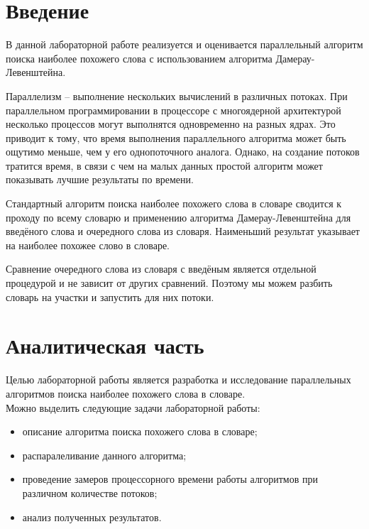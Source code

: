 \documentclass[12pt,a4paper]{report}
\begin{document}

\tableofcontents

\newpage
\chapter*{Введение}

В данной лабораторной работе реализуется и оценивается параллельный алгоритм поиска наиболее похожего слова с использованием алгоритма Дамерау-Левенштейна.

Параллелизм -- выполнение нескольких вычислений в различных потоках. 
При параллельном программировании в процессоре с многоядерной архитектурой несколько процессов могут выполнятся 
одновременно на разных ядрах.
Это приводит к тому, что время выполнения параллельного алгоритма может быть ощутимо меньше, чем у его 
однопоточного аналога. Однако, на создание потоков тратится время, в связи с чем на малых данных простой алгоритм может показывать лучшие результаты по времени.

Стандартный алгоритм поиска наиболее похожего слова в словаре сводится к проходу по всему словарю и применению алгоритма Дамерау-Левенштейна для введёного слова и очередного слова из словаря. Наименьший результат указывает на наиболее похожее слово в словаре. 

Сравнение очередного слова из словаря с введёным является отдельной процедурой и не зависит от других сравнений. Поэтому мы можем разбить словарь на участки и запустить для них потоки.

\newpage
\chapter{Аналитическая часть}

Целью лабораторной работы является разработка и исследование параллельных алгоритмов поиска наиболее похожего слова в словаре. \\

Можно выделить следующие задачи лабораторной работы:
\begin{itemize}
    \item описание алгоритма поиска похожего слова в словаре;
    \item распаралеливание данного алгоритма;
    \item проведение замеров процессорного времени работы алгоритмов при различном количестве потоков;
    \item анализ полученных результатов.
\end{itemize}
\end{document}
